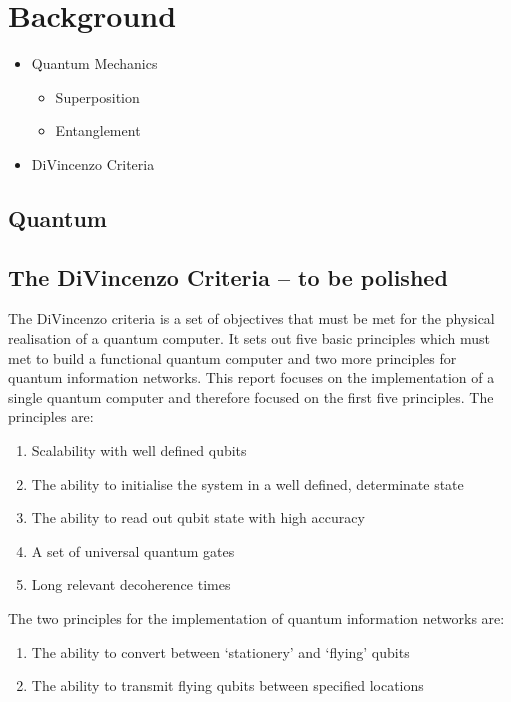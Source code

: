 \section{Background}
\begin{itemize}
    \item Quantum Mechanics
    \begin{itemize}
        \item Superposition
        \item Entanglement
    \end{itemize}
    
    \item DiVincenzo Criteria
\end{itemize}

\subsection{Quantum}

\subsection{The DiVincenzo Criteria -- to be polished}
The DiVincenzo criteria is a set of objectives that must be met for the physical realisation of a quantum computer. 
It sets out five basic principles which must met to build a functional quantum computer and two more principles for quantum information networks. \cite{bergou_quantum_2021}
This report focuses on the implementation of a single quantum computer and therefore focused on the first five principles.
The principles are:
\begin{enumerate}
    \item Scalability with well defined qubits
    \item The ability to initialise the system in a well defined, determinate state
    \item The ability to read out qubit state with high accuracy
    \item A set of universal quantum gates
    \item Long relevant decoherence times
    \setcounter{enumTemp}{\theenumi}
\end{enumerate}
The two principles for the implementation of quantum information networks are:
\begin{enumerate}
    \setcounter{enumi}{\theenumTemp}
    \item The ability to convert between `stationery' and `flying' qubits
    \item The ability to transmit flying qubits between specified locations
\end{enumerate}

